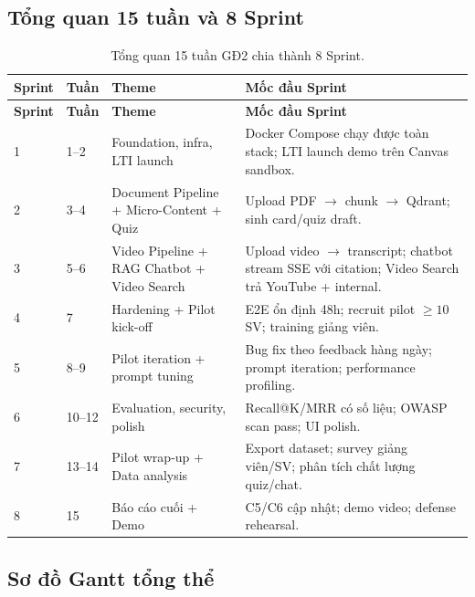 \subsection{Tổng quan 15 tuần và 8 Sprint}
\label{subsec:overview-gd2}

\begin{longtable}{|p{1.2cm}|p{1.5cm}|p{4cm}|p{6cm}|}
    \caption{Tổng quan 15 tuần GĐ2 chia thành 8 Sprint.}
    \label{tab:overview-gd2} \\
    \hline
    \textbf{Sprint} & \textbf{Tuần} & \textbf{Theme} & \textbf{Mốc đầu
    Sprint} \\
    \hline
    \endfirsthead
    \hline
    \textbf{Sprint} & \textbf{Tuần} & \textbf{Theme} & \textbf{Mốc đầu
    Sprint} \\
    \hline
    \endhead

    1 & 1--2 & Foundation, infra, LTI launch
      & Docker Compose chạy được toàn stack; LTI launch demo trên Canvas
        sandbox. \\
    \hline
    2 & 3--4 & Document Pipeline + Micro-Content + Quiz
      & Upload PDF $\to$ chunk $\to$ Qdrant; sinh card/quiz draft. \\
    \hline
    3 & 5--6 & Video Pipeline + RAG Chatbot + Video Search
      & Upload video $\to$ transcript; chatbot stream SSE với citation;
        Video Search trả YouTube + internal. \\
    \hline
    4 & 7 & Hardening + Pilot kick-off
      & E2E ổn định 48h; recruit pilot $\geq 10$ SV; training giảng
        viên. \\
    \hline
    5 & 8--9 & Pilot iteration + prompt tuning
      & Bug fix theo feedback hàng ngày; prompt iteration; performance
        profiling. \\
    \hline
    6 & 10--12 & Evaluation, security, polish
      & Recall@K/MRR có số liệu; OWASP scan pass; UI polish. \\
    \hline
    7 & 13--14 & Pilot wrap-up + Data analysis
      & Export dataset; survey giảng viên/SV; phân tích chất lượng
        quiz/chat. \\
    \hline
    8 & 15 & Báo cáo cuối + Demo
      & C5/C6 cập nhật; demo video; defense rehearsal. \\
    \hline
\end{longtable}

\subsection{Sơ đồ Gantt tổng thể}
\label{subsec:gantt-gd2}


